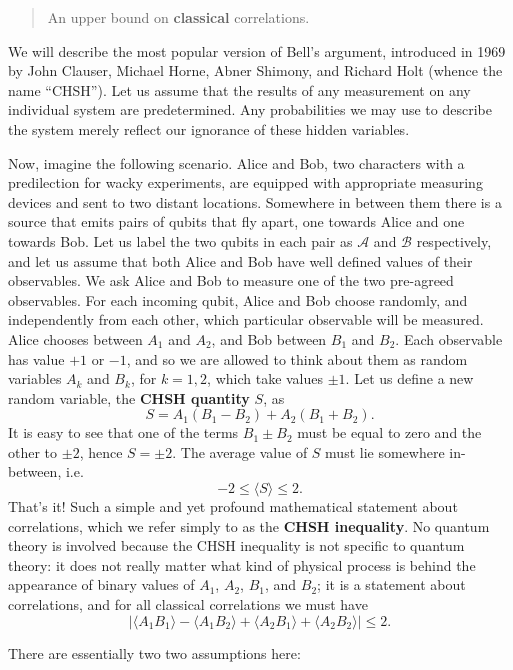 \documentclass[fleqn]{article}
\begin{document}
\begin{quote}
An upper bound on \textbf{classical} correlations.
\end{quote}

We will describe the most popular version of Bell's argument, introduced in 1969 by John Clauser, Michael Horne, Abner Shimony, and Richard Holt (whence the name ``CHSH'').
Let us assume that the results of any measurement on any individual system are predetermined.
Any probabilities we may use to describe the system merely reflect our ignorance of these hidden variables.

Now, imagine the following scenario.
Alice and Bob, two characters with a predilection for wacky experiments, are equipped with appropriate measuring devices and sent to two distant locations.
Somewhere in between them there is a source that emits pairs of qubits that fly apart, one towards Alice and one towards Bob.
Let us label the two qubits in each pair as \(\mathcal{A}\) and \(\mathcal{B}\) respectively, and let us assume that both Alice and Bob have well defined values of their observables.
We ask Alice and Bob to measure one of the two pre-agreed observables.
For each incoming qubit, Alice and Bob choose randomly, and independently from each other, which particular observable will be measured.
Alice chooses between \(A_1\) and \(A_2\), and Bob between \(B_1\) and \(B_2\).
Each observable has value \(+1\) or \(-1\), and so we are allowed to think about them as random variables \(A_k\) and \(B_k\), for \(k=1,2\), which take values \(\pm 1\).
Let us define a new random variable, the \textbf{CHSH quantity} \(S\), as
\[
  S = A_1(B_1 - B_2) + A_2(B_1 + B_2).
\]
It is easy to see that one of the terms \(B_1\pm B_2\) must be equal to zero and the other to \(\pm 2\), hence \(S=\pm2\).
The average value of \(S\) must lie somewhere in-between, i.e.
\[
  -2 \leqslant\langle S\rangle \leqslant 2.
\]
That's it!
Such a simple and yet profound mathematical statement about correlations, which we refer simply to as the \textbf{CHSH inequality}.
No quantum theory is involved because the CHSH inequality is not specific to quantum theory: it does not really matter what kind of physical process is behind the appearance of binary values of \(A_1\), \(A_2\), \(B_1\), and \(B_2\); it is a statement about correlations, and for all classical correlations we must have
\[
  |
    \langle A_1 B_1\rangle - \langle A_1 B_2\rangle + \langle A_2 B_1\rangle + \langle A_2 B_2\rangle
  | \leqslant 2.
\]

There are essentially two two assumptions here:
\end{document}
